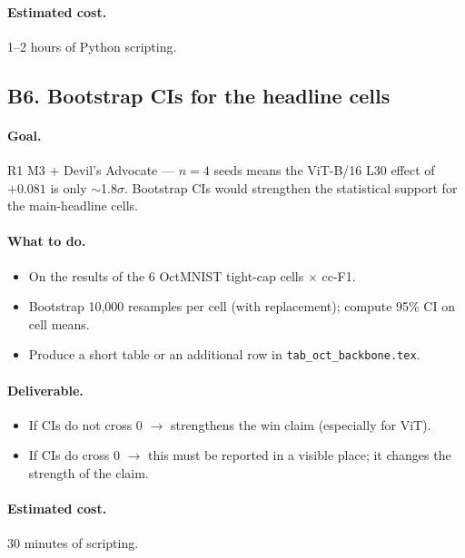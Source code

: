 \documentclass[11pt,a4paper]{article}
\newcommand{\file}[1]{\texttt{#1}}
\begin{document}
\paragraph{Estimated cost.} 1--2 hours of Python scripting.

\subsection{B6. Bootstrap CIs for the headline cells}

\paragraph{Goal.} R1 M3 + Devil's Advocate --- $n=4$ seeds means the
ViT-B/16 L30 effect of $+0.081$ is only $\sim$1.8$\sigma$. Bootstrap CIs
would strengthen the statistical support for the main-headline cells.

\paragraph{What to do.}
\begin{itemize}[nosep]
  \item On the results of the 6 OctMNIST tight-cap cells $\times$ cc-F1.
  \item Bootstrap 10{,}000 resamples per cell (with replacement); compute
        95\% CI on cell means.
  \item Produce a short table or an additional row in
        \file{tab\_oct\_backbone.tex}.
\end{itemize}

\paragraph{Deliverable.}
\begin{itemize}[nosep]
  \item If CIs do not cross 0 $\to$ strengthens the win claim (especially
        for ViT).
  \item If CIs do cross 0 $\to$ this must be reported in a visible place;
        it changes the strength of the claim.
\end{itemize}

\paragraph{Estimated cost.} 30 minutes of scripting.
\end{document}

